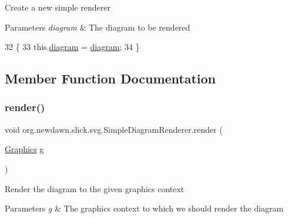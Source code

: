 Create a new simple renderer


\begin{DoxyParams}{Parameters}
{\em diagram} & The diagram to be rendered \\
\hline
\end{DoxyParams}

\begin{DoxyCode}
32                                                   \{
33         this.\mbox{\hyperlink{classorg_1_1newdawn_1_1slick_1_1svg_1_1_simple_diagram_renderer_a2b56dad891d98b19da92cd43376e02e8}{diagram}} = \mbox{\hyperlink{classorg_1_1newdawn_1_1slick_1_1svg_1_1_simple_diagram_renderer_a2b56dad891d98b19da92cd43376e02e8}{diagram}};
34     \}
\end{DoxyCode}


\subsection{Member Function Documentation}
\mbox{\label{classorg_1_1newdawn_1_1slick_1_1svg_1_1_simple_diagram_renderer_a96e551c2437df27242c43353a85bd8ec}} 
\subsubsection{\texorpdfstring{render()}{render()}\hspace{0.1cm}{\footnotesize\ttfamily [1/2]}}
{\footnotesize\ttfamily void org.\+newdawn.\+slick.\+svg.\+Simple\+Diagram\+Renderer.\+render (\begin{DoxyParamCaption}\item[{\mbox{\hyperlink{classorg_1_1newdawn_1_1slick_1_1_graphics}{Graphics}}}]{g }\end{DoxyParamCaption})\hspace{0.3cm}{\ttfamily [inline]}}

Render the diagram to the given graphics context


\begin{DoxyParams}{Parameters}
{\em g} & The graphics context to which we should render the diagram \\
\hline
\end{DoxyParams}

